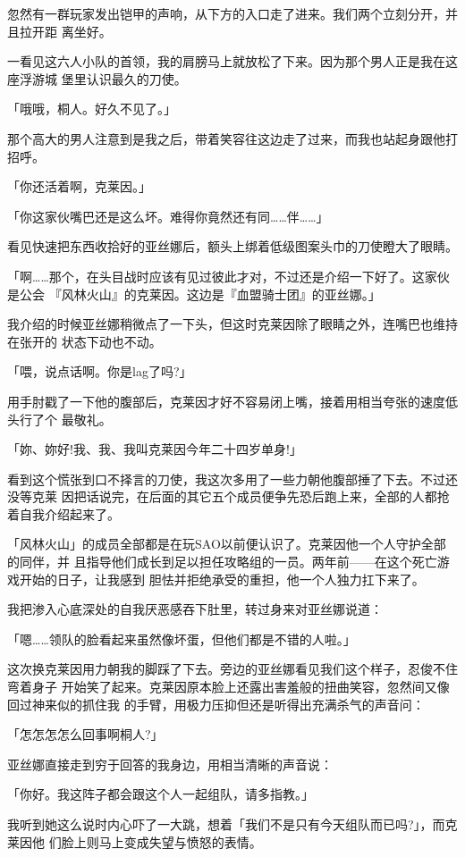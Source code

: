 \documentclass[11pt]{book}
\begin{document}
忽然有一群玩家发出铠甲的声响，从下方的入口走了进来。我们两个立刻分开，并且拉开距
离坐好。

一看见这六人小队的首领，我的肩膀马上就放松了下来。因为那个男人正是我在这座浮游城
堡里认识最久的刀使。

「哦哦，桐人。好久不见了。」

那个高大的男人注意到是我之后，带着笑容往这边走了过来，而我也站起身跟他打招呼。

「你还活着啊，克莱因。」

「你这家伙嘴巴还是这么坏。难得你竟然还有同……伴……」

看见快速把东西收拾好的亚丝娜后，额头上绑着低级图案头巾的刀使瞪大了眼睛。

「啊……那个，在头目战时应该有见过彼此才对，不过还是介绍一下好了。这家伙是公会
『风林火山』的克莱因。这边是『血盟骑士团』的亚丝娜。」

我介绍的时候亚丝娜稍微点了一下头，但这时克莱因除了眼睛之外，连嘴巴也维持在张开的
状态下动也不动。

「喂，说点话啊。你是lag了吗?」

用手肘戳了一下他的腹部后，克莱因才好不容易闭上嘴，接着用相当夸张的速度低头行了个
最敬礼。

「妳、妳好!我、我、我叫克莱因今年二十四岁单身!」

看到这个慌张到口不择言的刀使，我这次多用了一些力朝他腹部捶了下去。不过还没等克莱
因把话说完，在后面的其它五个成员便争先恐后跑上来，全部的人都抢着自我介绍起来了。

「风林火山」的成员全部都是在玩SAO以前便认识了。克莱因他一个人守护全部的同伴，并
且指导他们成长到足以担任攻略组的一员。两年前——在这个死亡游戏开始的日子，让我感到
胆怯并拒绝承受的重担，他一个人独力扛下来了。

我把渗入心底深处的自我厌恶感吞下肚里，转过身来对亚丝娜说道：

「嗯……领队的脸看起来虽然像坏蛋，但他们都是不错的人啦。」

这次换克莱因用力朝我的脚踩了下去。旁边的亚丝娜看见我们这个样子，忍俊不住弯着身子
开始笑了起来。克莱因原本脸上还露出害羞般的扭曲笑容，忽然间又像回过神来似的抓住我
的手臂，用极力压抑但还是听得出充满杀气的声音问：

「怎怎怎怎么回事啊桐人?」

亚丝娜直接走到穷于回答的我身边，用相当清晰的声音说：

「你好。我这阵子都会跟这个人一起组队，请多指教。」

我听到她这么说时内心吓了一大跳，想着「我们不是只有今天组队而已吗?」，而克莱因他
们脸上则马上变成失望与愤怒的表情。
\end{document}
